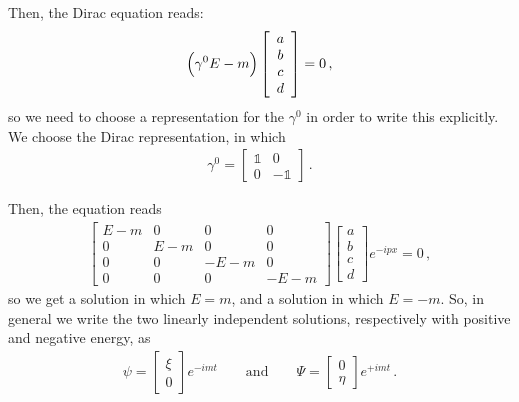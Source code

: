 \documentclass[main.tex]{subfiles}
\begin{document}
Then, the Dirac equation reads: 
%
\begin{subequations}
\begin{align}
\qty(\gamma^{0}E - m ) \left[\begin{array}{c}
a \\ 
b \\ 
c \\ 
d
\end{array}\right]=0
\,,
\end{align}
\end{subequations}
%
so we need to choose a representation for the \(\gamma^{0}\) in order to write this explicitly. We choose the Dirac representation, in which 
%
\begin{subequations}
\begin{align}
\gamma^{0} = \left[\begin{array}{cc}
\mathbb{1} & 0 \\ 
0 & -\mathbb{1}
\end{array}\right]
\,.
\end{align}
\end{subequations}

Then, the equation reads 
%
\begin{subequations}
\begin{align}
\left[\begin{array}{cccc}
E-m & 0 & 0 & 0 \\ 
0 & E-m & 0 & 0 \\ 
0 & 0 & -E-m & 0 \\ 
0 & 0 & 0 & -E-m
\end{array}\right] 
\left[\begin{array}{c}
a \\ 
b \\ 
c \\ 
d
\end{array}\right] e^{-ipx}
= 0
\,,
\end{align}
\end{subequations}
%
so we get a solution in which \(E=m\), and a solution in which \(E = -m \). So, in general we write the two linearly independent  solutions, respectively with positive and negative energy, as 
%
\begin{subequations}
\begin{align}
\psi = \left[\begin{array}{c}
\xi  \\ 
0
\end{array}\right] e^{-imt}
\qquad \text{and} \qquad
\Psi = \left[\begin{array}{c}
0 \\ 
\eta 
\end{array}\right] e^{+imt}
\,.
\end{align}
\end{subequations}
\end{document}
